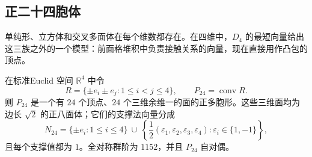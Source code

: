 \subsection{正二十四胞体}
\label{g1:subsec:E03:05}

单纯形、立方体和交叉多面体在每个维数都存在。在四维中，\(D_4\) 的最短向量给出这三族之外的一个模型：前面格堆积中负责接触关系的向量，现在直接用作凸包的顶点。

\begin{proposition}
	\label{g1:prop:regular-24-cell}
	在标准Euclid 空间 \(\mathbb R^4\) 中令
	\[
		R=\{\pm e_i\pm e_j:1\le i<j\le4\},\qquad
		P_{24}=\operatorname{conv}R.
	\]
	则 \(P_{24}\) 是一个有 \(24\) 个顶点、\(24\) 个三维余维一的面的正多胞形。这些三维面均为边长 \(\sqrt2\) 的正八面体；它们的支撑法向量分成
	\begin{equation}
		\label{g1:eq:24-cell-normals}
		N_{24}=\{\pm e_i:1\le i\le4\}
		\ \cup\ 
		\left\{\frac12(\varepsilon_1,\varepsilon_2,\varepsilon_3,\varepsilon_4):
		\varepsilon_i\in\{1,-1\}\right\},
	\end{equation}
	且每个支撑值都为 \(1\)。全对称群阶为 \(1152\)，并且 \(P_{24}\) 自对偶。
\end{proposition}
